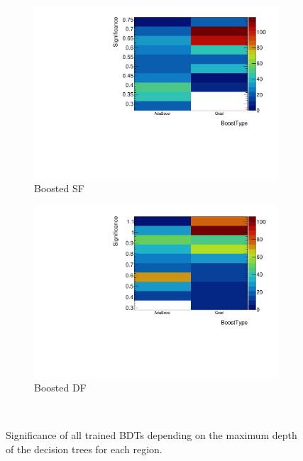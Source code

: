\begin{figure}[htb]
\begin{subfigure}[t]{0.45\textwidth}
        \includegraphics[width=\textwidth,page=3]{./plots/mva/scan/BOOST_SF_setting_vs_binned_sig.pdf}
        \caption{Boosted SF}
    \end{subfigure}
    \begin{subfigure}[t]{0.45\textwidth}
        \includegraphics[width=\textwidth,page=3]{./plots/mva/scan/BOOST_DF_setting_vs_binned_sig.pdf}
        \caption{Boosted DF}
    \end{subfigure}
    \caption{Significance of all trained BDTs depending on the maximum depth of the decision trees for each region.}~\label{fig:mva:scan:maxdepth}
\end{figure}

